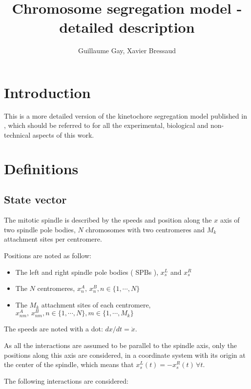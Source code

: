 \documentclass[a4paper,12pt]{article}
\title{Chromosome segregation model - detailed description}
\author{Guillaume Gay, Xavier Bressaud}
\date{}
\begin{document}


\maketitle{}


\section*{Introduction}

This is a more detailed version of the kinetochore segregation model
published in \cite{gayJCB12}, which should be referred to for
all the experimental, biological and non-technical aspects of this
work.

 
\section{Definitions}
\label{sec:defs}

\subsection{State vector}

The mitotic spindle is described by the speeds and position along the
$x$ axis of two spindle pole bodies, $N$ chromosomes with two
centromeres and $M_k$ attachment sites per centromere.

Positions are noted as follow:
\begin{itemize}
\item The left and right spindle pole bodies ( SPBs ), $x_s^L$ and $x_s^R$
\item The $N$ centromeres, $x_n^A, \, x_n^B, n \in \{1,\cdots, N\}$
\item The $M_k$ attachment sites of each centromere, $x_{nm}^A, \,
  x_{nm}^B, n \in \{1, \cdots, N \}, m \in \{1, \cdots, M_k\}$
\end{itemize}
The speeds are noted with a dot: $dx / dt = \dot{x}$.

As all the interactions are assumed to be parallel to the spindle
axis, only the positions along this axis are considered, in a coordinate
system with its origin at the center of the spindle, which means that
$x_s^L(t) = - x_s^R(t)\, \forall t$.

The following interactions are considered:
\end{document}
